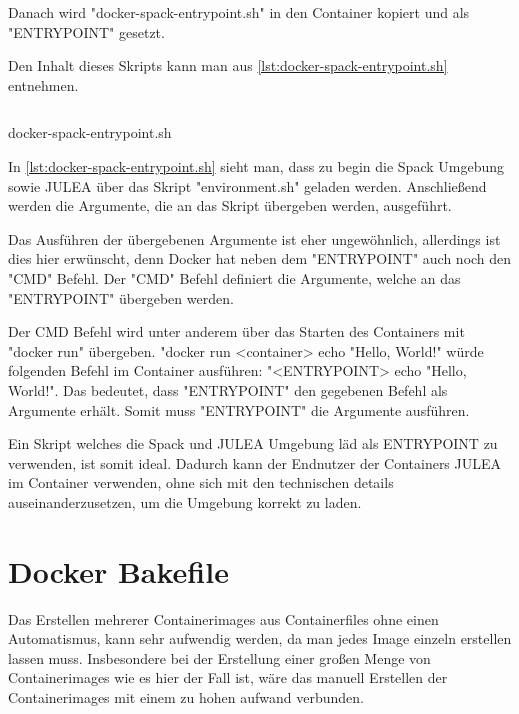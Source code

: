 Danach wird "docker-spack-entrypoint.sh" in den Container kopiert und als "ENTRYPOINT" gesetzt. 

Den Inhalt dieses Skripts kann man aus \cref{lst:docker-spack-entrypoint.sh} entnehmen.

\begin{listing}[H]
    \inputminted{bash}{./code-examples/docker-spack-entrypoint.sh}
    \caption{docker-spack-entrypoint.sh}
    \label{lst:docker-spack-entrypoint.sh}
\end{listing}

In \cref{lst:docker-spack-entrypoint.sh} sieht man, dass zu begin die Spack Umgebung sowie JULEA über das Skript "environment.sh" geladen werden.
Anschließend werden die Argumente, die an das Skript übergeben werden, ausgeführt.

Das Ausführen der übergebenen Argumente ist eher ungewöhnlich, allerdings ist dies hier erwünscht, denn Docker hat neben dem "ENTRYPOINT" auch noch den "CMD" Befehl. Der "CMD" Befehl definiert die Argumente, welche an das "ENTRYPOINT" übergeben werden. 

Der CMD Befehl wird unter anderem über das Starten des Containers mit "docker run" übergeben. "docker run <container> echo "Hello, World!" würde folgenden Befehl im Container ausführen: "<ENTRYPOINT> echo "Hello, World!". Das bedeutet, dass "ENTRYPOINT" den gegebenen Befehl als Argumente erhält. Somit muss "ENTRYPOINT" die Argumente ausführen.

Ein Skript welches die Spack und JULEA Umgebung läd als ENTRYPOINT zu verwenden, ist somit ideal. Dadurch kann der Endnutzer der Containers JULEA im Container verwenden, ohne sich mit den technischen details auseinanderzusetzen, um die Umgebung korrekt zu laden.

\pagebreak

\section{Docker Bakefile}

Das Erstellen mehrerer Containerimages aus Containerfiles ohne einen Automatismus, kann sehr aufwendig werden, da man jedes Image einzeln erstellen lassen muss. Insbesondere bei der Erstellung einer großen Menge von Containerimages wie es hier der Fall ist, wäre das manuell Erstellen der Containerimages mit einem zu hohen aufwand verbunden. 

